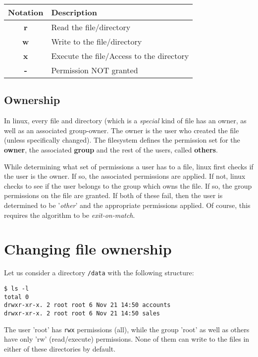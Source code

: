 \vspace{-15pt}
\begin{center}
	\begin{tabular}{cl}
		\toprule
		\textbf{Notation} &\textbf{Description} \\
		\midrule
		\textbf{r}	&Read the file/directory \\
		\textbf{w}	&Write to the file/directory \\
		\textbf{x}	&Execute the file/Access to the directory \\
		\textbf{-}	&Permission NOT granted \\
		\bottomrule
	\end{tabular}
\end{center}

\subsection{Ownership}
In linux, every file and directory (which is a \textit{special} kind of file has an owner, as well as an associated group-owner. The owner is the user who created the file (unless specifically changed). The filesystem defines the permission set for the \textbf{owner}, the associated \textbf{group} and the rest of the users, called \textbf{others}.

While determining what set of permissions a user has to a file, linux first checks if the user is the owner. If so, the associated permissions are applied. If not, linux checks to see if the user belongs to the group which owns the file. If so, the group permissions on the file are granted. If both of these fail, then the user is determined to be '\textit{other}' and the appropriate permissions applied. Of course, this requires the algorithm to be \textit{exit-on-match}.

\section{Changing file ownership}
Let us consider a directory \verb|/data| with the following structure:

\vspace{-15pt}
\begin{verbatim}
$ ls -l
total 0
drwxr-xr-x. 2 root root 6 Nov 21 14:50 accounts
drwxr-xr-x. 2 root root 6 Nov 21 14:50 sales
\end{verbatim}
\vspace{-10pt}

\noindent
The user 'root' has \verb|rwx| permissions (all), while the group 'root' as well as others have only 'rw' (read/execute) permissions. None of them can write to the files in either of these directories by default. 

